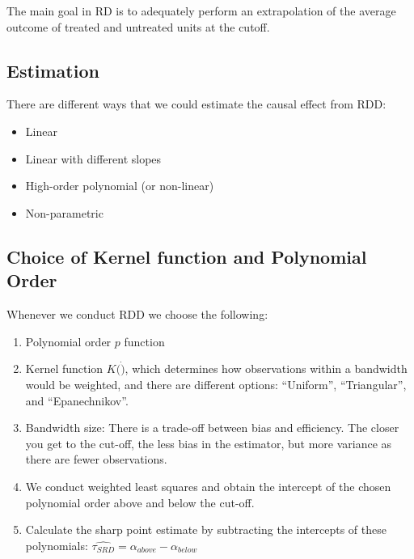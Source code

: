 \documentclass[
  letterpaper,
  DIV=11,
  numbers=noendperiod]{scrreprt}
\providecommand{\tightlist}{%
  \setlength{\itemsep}{0pt}\setlength{\parskip}{0pt}}\usepackage{longtable,booktabs,array}
\begin{document}
The main goal in RD is to adequately perform an extrapolation of the
average outcome of treated and untreated units at the cutoff.

\hypertarget{estimation}{%
\subsection{Estimation}\label{estimation}}

There are different ways that we could estimate the causal effect from
RDD:

\begin{itemize}
\tightlist
\item
  Linear
\item
  Linear with different slopes
\item
  High-order polynomial (or non-linear)
\item
  Non-parametric
\end{itemize}

\hypertarget{choice-of-kernel-function-and-polynomial-order}{%
\subsection{Choice of Kernel function and Polynomial
Order}\label{choice-of-kernel-function-and-polynomial-order}}

Whenever we conduct RDD we choose the following:

\begin{enumerate}
\def\labelenumi{\arabic{enumi}.}
\tightlist
\item
  Polynomial order \(p\) function
\item
  Kernel function \(K(\dot)\), which determines how observations within
  a bandwidth would be weighted, and there are different options:
  ``Uniform'', ``Triangular'', and ``Epanechnikov''.
\item
  Bandwidth size: There is a trade-off between bias and efficiency. The
  closer you get to the cut-off, the less bias in the estimator, but
  more variance as there are fewer observations.
\item
  We conduct weighted least squares and obtain the intercept of the
  chosen polynomial order above and below the cut-off.
\item
  Calculate the sharp point estimate by subtracting the intercepts of
  these polynomials:
  \(\hat{\tau_{SRD}} = \alpha_{above} - \alpha_{below}\)
\end{enumerate}

\hfill\break
\end{document}
